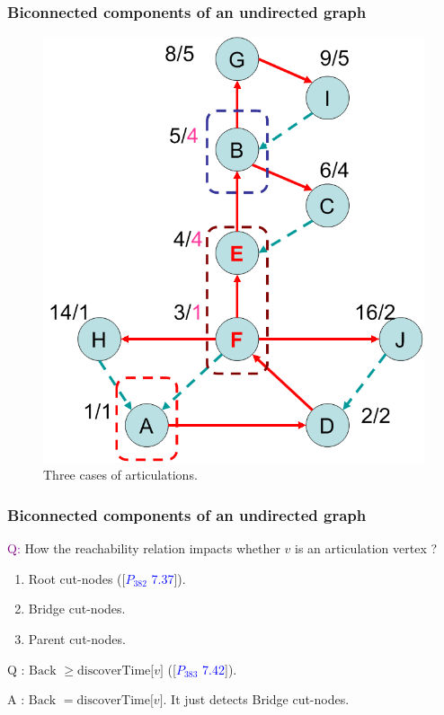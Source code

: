 \begin{frame}
  \frametitle{Biconnected components of an undirected graph}

  \begin{figure}
    \begin{center}
      \includegraphics[scale=0.30]{figure/bfs_dfs/articulationex}
      \caption{Three cases of articulations.}
      \label{fig:articulations}
    \end{center}
  \end{figure}

\end{frame}


\begin{frame}
  \frametitle{Biconnected components of an undirected graph}

  \textcolor{purple}{Q:} How the reachability relation impacts whether $v$ is an articulation vertex ?
  \begin{enumerate}
    \item Root cut-nodes ([\textcolor{blue}{$P_{382}$ 7.37}]).
    \item Bridge cut-nodes.
    \item Parent cut-nodes.
  \end{enumerate}

  \pause
  \vspace{0.40cm}

    Q : $\textrm{Back } \ge \textrm{discoverTime} \lbrack v \rbrack$ ([\textcolor{blue}{$P_{383}$ 7.42}]).

  \pause

    A : $\textrm{Back } = \textrm{discoverTime} \lbrack v \rbrack$. It just detects Bridge cut-nodes.

\end{frame} 
